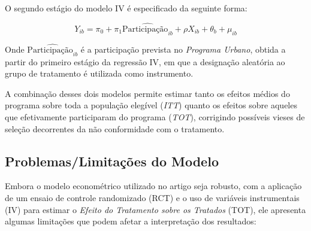 \documentclass[a4paper,12pt]{article}[abntex2]
\begin{document}
O segundo estágio do modelo IV é especificado da seguinte forma:

\begin{equation}
Y_{ib} = \pi_0 + \pi_1 \hat{\text{Participação}_{ib}} + \rho X_{ib} + \theta_b + \mu_{ib}
\end{equation}

Onde \( \hat{\text{Participação}_{ib}} \) é a participação prevista no \textit{Programa Urbano}, obtida a partir do primeiro estágio da regressão IV, em que a designação aleatória ao grupo de tratamento é utilizada como instrumento.

A combinação desses dois modelos permite estimar tanto os efeitos médios do programa sobre toda a população elegível (\textit{ITT}) quanto os efeitos sobre aqueles que efetivamente participaram do programa (\textit{TOT}), corrigindo possíveis vieses de seleção decorrentes da não conformidade com o tratamento.
\subsection{\textbf{Problemas/Limitações do Modelo}}

Embora o modelo econométrico utilizado no artigo seja robusto, com a aplicação de um ensaio de controle randomizado (RCT) e o uso de variáveis instrumentais (IV) para estimar o \textit{Efeito do Tratamento sobre os Tratados} (TOT), ele apresenta algumas limitações que podem afetar a interpretação dos resultados:
\end{document}
